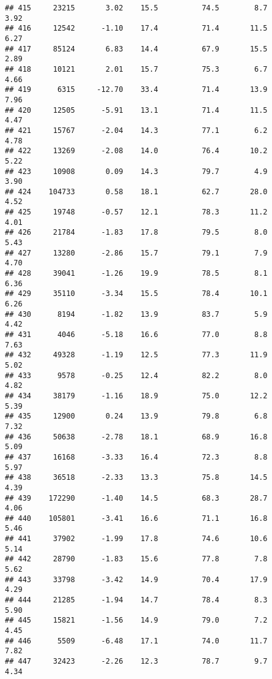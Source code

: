 \documentclass[
]{article}
\begin{document}
\begin{verbatim}
## 415     23215       3.02    15.5          74.5        8.7              3.92
## 416     12542      -1.10    17.4          71.4       11.5              6.27
## 417     85124       6.83    14.4          67.9       15.5              2.89
## 418     10121       2.01    15.7          75.3        6.7              4.66
## 419      6315     -12.70    33.4          71.4       13.9              7.96
## 420     12505      -5.91    13.1          71.4       11.5              4.47
## 421     15767      -2.04    14.3          77.1        6.2              4.78
## 422     13269      -2.08    14.0          76.4       10.2              5.22
## 423     10908       0.09    14.3          79.7        4.9              3.90
## 424    104733       0.58    18.1          62.7       28.0              4.52
## 425     19748      -0.57    12.1          78.3       11.2              4.01
## 426     21784      -1.83    17.8          79.5        8.0              5.43
## 427     13280      -2.86    15.7          79.1        7.9              4.70
## 428     39041      -1.26    19.9          78.5        8.1              6.36
## 429     35110      -3.34    15.5          78.4       10.1              6.26
## 430      8194      -1.82    13.9          83.7        5.9              4.42
## 431      4046      -5.18    16.6          77.0        8.8              7.63
## 432     49328      -1.19    12.5          77.3       11.9              5.02
## 433      9578      -0.25    12.4          82.2        8.0              4.82
## 434     38179      -1.16    18.9          75.0       12.2              5.39
## 435     12900       0.24    13.9          79.8        6.8              7.32
## 436     50638      -2.78    18.1          68.9       16.8              5.09
## 437     16168      -3.33    16.4          72.3        8.8              5.97
## 438     36518      -2.33    13.3          75.8       14.5              4.39
## 439    172290      -1.40    14.5          68.3       28.7              4.06
## 440    105801      -3.41    16.6          71.1       16.8              5.46
## 441     37902      -1.99    17.8          74.6       10.6              5.14
## 442     28790      -1.83    15.6          77.8        7.8              5.62
## 443     33798      -3.42    14.9          70.4       17.9              4.29
## 444     21285      -1.94    14.7          78.4        8.3              5.90
## 445     15821      -1.56    14.9          79.0        7.2              4.45
## 446      5509      -6.48    17.1          74.0       11.7              7.82
## 447     32423      -2.26    12.3          78.7        9.7              4.34

\end{verbatim}
\end{document}

